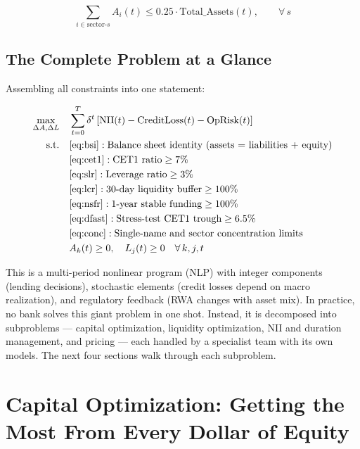 \documentclass[12pt,a4paper]{article}
\begin{document}
\begin{equation}
  \sum_{i \in \text{sector-}s} A_i(t) \leq 0.25 \cdot \text{Total\_Assets}(t), \qquad \forall\, s
\end{equation}

\subsection{The Complete Problem at a Glance}

Assembling all constraints into one statement:

\begin{equation}
  \begin{aligned}
    \max_{\Delta A, \Delta L} \quad &
      \sum_{t=0}^{T} \delta^t \left[ \text{NII}(t) - \text{CreditLoss}(t)
      - \text{OpRisk}(t) \right] \\
    \text{s.t.} \quad
    & \eqref{eq:bsi}: \text{Balance sheet identity (assets = liabilities + equity)} \\
    & \eqref{eq:cet1}: \text{CET1 ratio} \geq 7\% \\
    & \eqref{eq:slr}: \text{Leverage ratio} \geq 3\% \\
    & \eqref{eq:lcr}: \text{30-day liquidity buffer} \geq 100\% \\
    & \eqref{eq:nsfr}: \text{1-year stable funding} \geq 100\% \\
    & \eqref{eq:dfast}: \text{Stress-test CET1 trough} \geq 6.5\% \\
    & \eqref{eq:conc}: \text{Single-name and sector concentration limits} \\
    & A_k(t) \geq 0, \quad L_j(t) \geq 0 \quad \forall\, k, j, t
  \end{aligned}
  \label{eq:fullopt}
\end{equation}

This is a multi-period nonlinear program (NLP) with integer components
(lending decisions), stochastic elements (credit losses depend on macro
realization), and regulatory feedback (RWA changes with asset mix).  In
practice, no bank solves this giant problem in one shot.  Instead, it is
decomposed into subproblems --- capital optimization, liquidity optimization,
NII and duration management, and pricing --- each handled by a specialist
team with its own models.  The next four sections walk through each subproblem.

\section{Capital Optimization: Getting the Most From Every Dollar of Equity}
\end{document}
